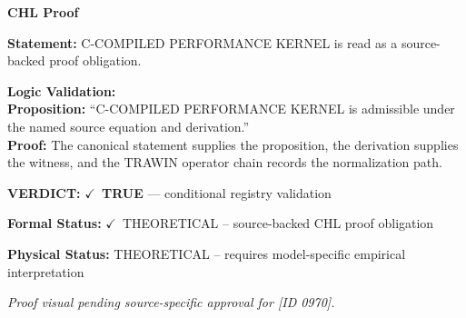 \vspace{0.45em}
\noindent\textbf{CHL Proof}\par
\textbf{Statement:} C-COMPILED PERFORMANCE KERNEL is read as a source-backed proof obligation.

\textbf{Logic Validation:}\\
\textbf{Proposition:} ``C-COMPILED PERFORMANCE KERNEL is admissible under the named source equation and derivation.''\\
\textbf{Proof:} The canonical statement supplies the proposition, the derivation supplies the witness, and the TRAWIN operator chain records the normalization path.

\textbf{VERDICT:} \ensuremath{\checkmark}\ \textbf{TRUE} --- conditional registry validation

\textbf{Formal Status:} \ensuremath{\checkmark}\ THEORETICAL -- source-backed CHL proof obligation

\textbf{Physical Status:} THEORETICAL -- requires model-specific empirical interpretation
\par\vspace{0.45em}
\par
\vfill
\begingroup\footnotesize\itshape
Proof visual pending source-specific approval for [ID 0970].
\par\endgroup
\vfill
\endgroup
\endgroup
